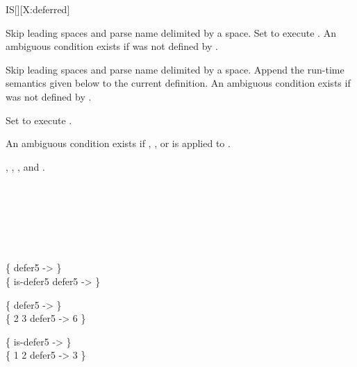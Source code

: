 \begin{worddef}{}{IS}[][X:deferred]
\interpret

	Skip leading spaces and parse name delimited by a space. Set
	 to execute . An ambiguous condition
	exists if  was not defined by .

\compile

	Skip leading spaces and parse name delimited by a space. Append
	the run-time semantics given below to the current definition.
	An ambiguous condition exists if  was not defined by
	.

\runtime

	Set  to execute .

	An ambiguous condition exists if , \word{[COMPILE]},
	\word{[']} or  is applied to .

\see {},
	,
	, and
	.

	\begin{defer}
	\implementation
		\word{:}  \\
		\tab {}   \\
		\tab[2]  \word{[']}   \\
		\tab {} \\
		\tab[2]   \\
		\tab {} \word{;} 

	\testing
		\{  defer5 -> \} \\
		\{ \word{:} is-defer5  defer5 \word{;} -> \}

		\{  \word{*}  defer5 -> \} \\
		\{ 2 3 defer5 -> 6 \}

		\{  \word{+} is-defer5 -> \} \\
		\{ 1 2 defer5 -> 3 \}
	\end{defer}
\end{worddef}


